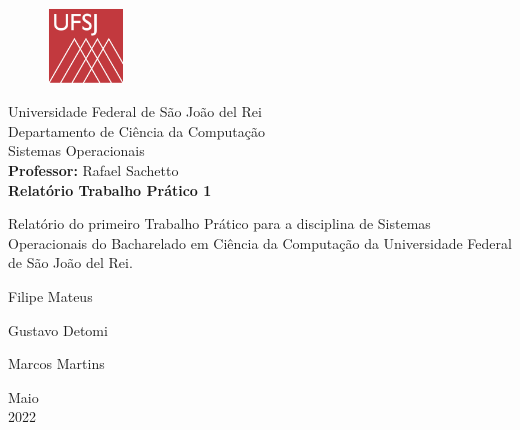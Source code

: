 \documentclass[a4paper, 12pt]{article}
\begin{document}

\begin{titlepage}
	\begin{center}
	
	\begin{figure}[!ht]
	\centering
	\includegraphics[width=2cm]{relatorio/ufsj.png}
	\end{figure}

		\LARGE{Universidade Federal de São João del Rei}\\
		\large{Departamento de Ciência da Computação}\\ 
		\large{Sistemas Operacionais}\\
		\large{\textbf{Professor:} Rafael Sachetto} \\
		\vspace{15pt}
        \vspace{95pt}
        \textbf{\LARGE{Relatório Trabalho Prático 1}}\\
		\vspace{3,5cm}
	\end{center}
	
	\begin{flushright}
   \begin{list}{}{
      \setlength{\leftmargin}{4.5cm}
      \setlength{\rightmargin}{0cm}
      \setlength{\labelwidth}{0pt}
      \setlength{\labelsep}{\leftmargin}}

      \item Relatório do primeiro Trabalho Prático para a disciplina de Sistemas Operacionais do Bacharelado em Ciência da Computação da Universidade Federal de São João del Rei.

      \begin{list}{}{
      \setlength{\leftmargin}{0cm}
      \setlength{\rightmargin}{0cm}
      \setlength{\labelwidth}{0pt}
      \setlength{\labelsep}{\leftmargin}}

			\item \hfill Filipe Mateus \
            \item \hfill Gustavo Detomi \
      		\item \hfill Marcos Martins \

      \end{list}
   \end{list}
 \end{flushright}
	\vspace{1cm}
	
	\begin{center}
		\vspace{\fill}
			 Maio\\
		 2022
			\end{center}
\end{titlepage}
\end{document}
